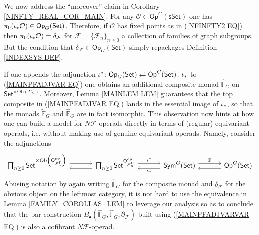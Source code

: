 \documentclass[a4paper,10pt]{article}%
\begin{document}
\begin{remark}
We now address the ``moreover'' claim in Corollary \ref{NINFTY_REAL_COR_MAIN}. 
For any $\mathcal{O} \in \mathsf{Op}^G(\mathsf{sSet})$
one has $\pi_0 (\iota_{\**} \mathcal{O})\in \mathsf{Op}_G(\mathsf{Set})$. Therefore, if $\mathcal{O}$ has fixed points as in (\ref{NFINFTY2 EQ}) then 
$\pi_0 (\iota_{\**} \mathcal{O}) = \delta_{\mathcal{F}}$
for $\mathcal{F} = \{\mathcal{F}_n\}_{n \geq 0}$
a collection of families of graph subgroups.
But the condition that $\delta_{\mathcal{F}}\in \mathsf{Op}_G(\mathsf{Set})$ simply repackages Definition \ref{INDEXSYS DEF}.
\end{remark}


\begin{remark}
If one appends the adjunction
$\iota^{\**} \colon
	\mathsf{Op}_G(\mathsf{Set})
	\rightleftarrows
	\mathsf{Op}^G(\mathsf{Set})
\colon \iota_{\**}$
to (\ref{MAINPFADJVAR EQ}) one obtains
an additional composite monad
$\widehat{\mathbb{F}}_G$
on
$\mathsf{Set}^{\times \text{Ob}(\Sigma_G)}$.
Moreover, Lemma \ref{MAINLEM LEM}
guarantees that the top composite in 
(\ref{MAINPFADJVAR EQ})
lands in the essential image of $\iota_{\**}$,
so that the monads 
$\widetilde{\mathbb{F}}_G$ and
$\widehat{\mathbb{F}}_G$
are in fact isomorphic.
This observation now hints at how 
one can build a model for 
$N \mathcal{F}$-operads 
directly in terms of (regular) equivariant operads,
i.e. without making use of genuine equivariant operads.
Namely, consider the adjunctions
\begin{equation}\label{MAINPFADJVARVAR EQ}
\begin{tikzcd}[column sep =3.3em]
	\prod_{n \geq 0}
	\mathsf{Set}^{\times \text{Ob}
	\left(\mathsf{O}^{op}_{\mathcal{F}_n^{\Gamma}}\right)}
	\ar[shift left=1.5]{r}
&
	\prod_{n \geq 0}
	\mathsf{Set}^{\mathsf{O}^{op}_{\mathcal{F}_n^{\Gamma}}} 
	\arrow[l, shift left=1.5]
	\ar[r, shift left=1.5,swap,"\iota^{\**}"']
&
	\mathsf{Sym}^{G}(\mathsf{Set}) 
	\ar[l, shift left=1.5,swap,"\iota_{\**}"']
	\arrow[r, shift left=1.5,swap,"\mathbb{F}"']
&
	\mathsf{Op}^G(\mathsf{Set})
	\ar[shift left=1.5]{l}
\end{tikzcd}
\end{equation}
Abusing notation by again writing 
$\widehat{\mathbb{F}}_G$
for the composite monad and
$\delta_{\mathcal{F}}$
for the obvious object on 
the leftmost category,
it is not hard to
use the equivalence in 
Lemma \ref{FAMILY_COROLLAS_LEM}
to leverage our analysis so as to conclude that
the bar construction
$B_{\bullet}(\widehat{\mathbb{F}}_G,
\widehat{\mathbb{F}}_G,
\partial_{\mathcal{F}})
$
built using (\ref{MAINPFADJVARVAR EQ})
is also a cofibrant $N \mathcal{F}$-operad.


\end{remark}
\end{document}
